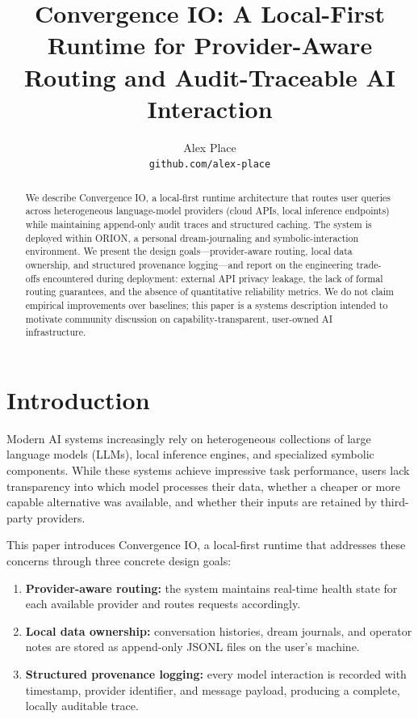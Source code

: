 \documentclass{article}
\title{
Convergence IO: A Local-First Runtime for\newline
Provider-Aware Routing and Audit-Traceable AI Interaction
}
\author{
Alex Place \\
\texttt{github.com/alex-place}
}
\begin{document}
\maketitle

\begin{abstract}
We describe Convergence IO, a local-first runtime architecture that routes user
queries across heterogeneous language-model providers (cloud APIs, local
inference endpoints) while maintaining append-only audit traces and structured
caching. The system is deployed within ORION, a personal dream-journaling and
symbolic-interaction environment. We present the design goals---provider-aware
routing, local data ownership, and structured provenance logging---and report on
the engineering trade-offs encountered during deployment: external API privacy
leakage, the lack of formal routing guarantees, and the absence of quantitative
reliability metrics. We do not claim empirical improvements over baselines; this
paper is a systems description intended to motivate community discussion on
capability-transparent, user-owned AI infrastructure.
\end{abstract}

\section{Introduction}

Modern AI systems increasingly rely on heterogeneous collections of large
language models (LLMs), local inference engines, and specialized symbolic
components. While these systems achieve impressive task performance, users
lack transparency into which model processes their data, whether a cheaper or
more capable alternative was available, and whether their inputs are retained
by third-party providers.

This paper introduces Convergence IO, a local-first runtime that addresses these
concerns through three concrete design goals:
\begin{enumerate}[label=(\arabic*)]
    \item \textbf{Provider-aware routing:} the system maintains real-time
    health state for each available provider and routes requests accordingly.
    \item \textbf{Local data ownership:} conversation histories, dream
    journals, and operator notes are stored as append-only JSONL files on the
    user's machine.
    \item \textbf{Structured provenance logging:} every model interaction is
    recorded with timestamp, provider identifier, and message payload, producing
    a complete, locally auditable trace.
\end{enumerate}
\end{document}
